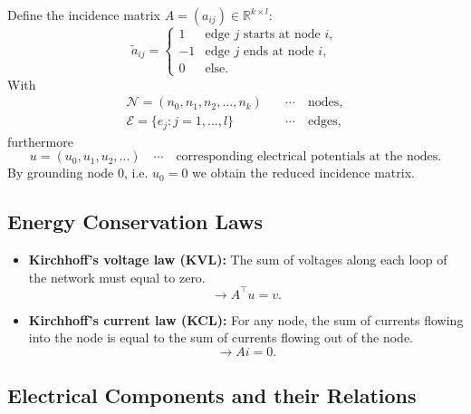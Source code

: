 	\begin{frame}
		Define the incidence matrix $A = (a_{ij}) \in \mathbb{R}^{k \times l}$:
		\begin{displaymath}
			\tilde{a}_{ij} = 
			\begin{cases}
				1 &   \text{edge $j$ starts at node $i$},\\
				-1 &  \text{edge $j$  ends at node $i$},\\
				0 & \text{else}.				
			\end{cases}
		\end{displaymath}
		With 
		\begin{align*}
			\mathcal{N} = (n_0, n_1, n_2, ..., n_k) \quad &\cdots \quad \text{nodes},\\
			\mathcal{E} = \{e_{j}: j = 1,...,l\} \quad &\cdots \quad \text{edges},
		\end{align*}
		furthermore
		\begin{displaymath}
			u = (u_0, u_1, u_2, ...) \quad \cdots \quad \text{corresponding electrical potentials at the nodes}.
		\end{displaymath}
		By grounding node $0$, i.e. $u_0 = 0$ we obtain the reduced incidence matrix.
	\end{frame}

	\subsection{Energy Conservation Laws}
	\begin{frame}
		\begin{itemize}
			\item \textbf{Kirchhoff's voltage law (KVL):} \newline
			The sum of voltages along each loop of the network must equal to zero.
			\begin{equation}
				\label{KVL}
				\to A^\top  u = v.
			\end{equation}
			\item \textbf{Kirchhoff's current law (KCL):} \newline
			For any node, the sum of currents flowing into the node is equal to the sum of currents flowing out of the node.
			\begin{equation}
				\label{KCL}
				\to A  i = 0.
			\end{equation}
		\end{itemize}
	\end{frame}

	\subsection{Electrical Components and their Relations}
		
